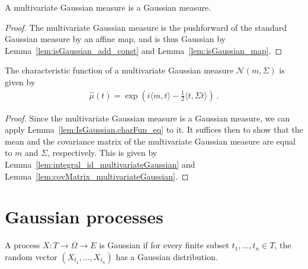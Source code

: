 \begin{lemma}\label{lem:isGaussian_multivariateGaussian}
  \leanok
A multivariate Gaussian measure is a Gaussian measure.
\end{lemma}

\begin{proof}
The multivariate Gaussian measure is the pushforward of the standard Gaussian measure by an affine map, and is thus Gaussian by Lemma~\ref{lem:isGaussian_add_const} and Lemma~\ref{lem:isGaussian_map}.
\end{proof}


\begin{theorem}\label{thm:charFun_multivariateGaussian}
The characteristic function of a multivariate Gaussian measure $\mathcal{N}(m, \Sigma)$ is given by
\begin{align*}
  \hat{\mu}(t) = \exp\left(i \langle m, t \rangle - \frac{1}{2} \langle t, \Sigma t \rangle\right)
  \: .
\end{align*}
\end{theorem}

\begin{proof}
Since the multivariate Gaussian measure is a Gaussian measure, we can apply Lemma~\ref{lem:IsGaussian.charFun_eq} to it.
It suffices then to show that the mean and the covariance matrix of the multivariate Gaussian measure are equal to $m$ and $\Sigma$, respectively.
This is given by Lemma~\ref{lem:integral_id_multivariateGaussian} and Lemma~\ref{lem:covMatrix_multivariateGaussian}.
\end{proof}


\section{Gaussian processes}
\label{sec:gaussian_processes}

\begin{definition}\label{def:IsGaussianProcess}
  \leanok
A process $X : T \to \Omega \to E$ is Gaussian if for every finite subset $t_1, \ldots, t_n \in T$, the random vector $(X_{t_1}, \ldots, X_{t_n})$ has a Gaussian distribution.
\end{definition}


